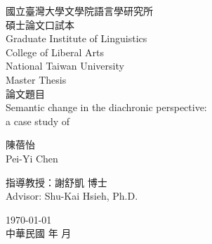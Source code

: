 \begin{titlepage}
    \begin{center}
        \titlepagestyle
        國立臺灣大學文學院語言學研究所\\
        碩士論文口試本\\
        \vspace{.3cm}
        \fontsize{14}{14}\selectfont
        \linespread{1.5}
        Graduate Institute of Linguistics\\
        College of Liberal Arts\\
        \vspace{.3cm}
        \fontsize{16}{16}\selectfont
        \linespread{1.5}
        National Taiwan University\\
        Master Thesis\\

        \vspace{1.5cm}
        \titlepagestyle
        論文題目\\
        Semantic change in the diachronic perspective:\\
        a case study of \jia

        \vspace{2.5cm}
        陳蓓怡\\
        Pei-Yi Chen

        \vspace{1cm}
        指導教授：謝舒凱 博士\\
        Advisor: Shu-Kai Hsieh, Ph.D.
            
        \vspace{1cm}
        \monthyearEN\today\\
        中華民國 \yearZH 年 \the\month 月
    \end{center}
    \restoregeometry
\end{titlepage}